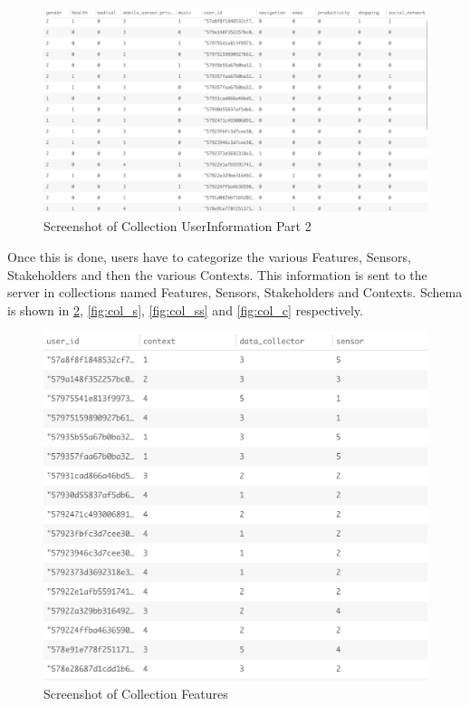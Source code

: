 \begin{figure}[ht!]
\centering
\includegraphics[width=\textwidth,keepaspectratio,height=0.6\textwidth]{./images/collection_ui_2}
\caption{Screenshot of Collection UserInformation Part 2}
\label{fig:col_ui_2}
\end{figure}

Once this is done, users have to categorize the various Features, Sensors, Stakeholders and then the various Contexts. This information is sent to the server in collections named Features, Sensors, Stakeholders and Contexts. Schema is shown in \ref{fig:col_f}, \ref{fig:col_s}, \ref{fig:col_ss} and \ref{fig:col_c} respectively.

\begin{figure}[ht!]
\centering
\includegraphics[width=\textwidth,keepaspectratio,height=0.6\textwidth]{./images/collection_feature_cat}
\caption{Screenshot of Collection Features}
\label{fig:col_f}
\end{figure}

